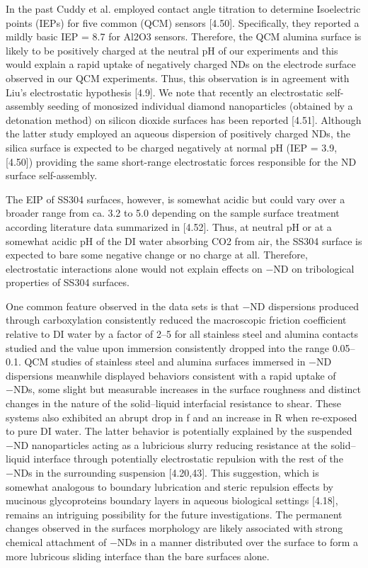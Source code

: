 In the past Cuddy et al. employed contact angle titration to determine Isoelectric points (IEPs) for five common (QCM) sensors [4.50]. Specifically, they reported a mildly basic IEP = 8.7 for Al2O3 sensors. Therefore, the QCM alumina surface is likely to be positively charged at the neutral pH of our experiments and this would explain a rapid uptake of negatively charged NDs on the electrode surface observed in our QCM experiments. Thus, this observation is in agreement with Liu’s electrostatic hypothesis [4.9]. We note that recently an electrostatic self-assembly seeding of monosized individual diamond nanoparticles (obtained by a detonation method) on silicon dioxide surfaces has been reported [4.51]. Although the latter study employed an aqueous dispersion of positively charged NDs, the silica surface is expected to be charged negatively at normal pH (IEP = 3.9, [4.50]) providing the same short-range electrostatic forces responsible for the ND surface self-assembly.

The EIP of SS304 surfaces, however, is somewhat acidic but could vary over a broader range from ca. 3.2 to 5.0 depending on the sample surface treatment according literature data summarized in [4.52]. Thus, at neutral pH or at a somewhat acidic pH of the DI water absorbing CO2 from air, the SS304 surface is expected to bare some negative change or no charge at all. Therefore, electrostatic interactions alone would not explain effects on −ND on tribological properties of SS304 surfaces.

One common feature observed in the data sets is that −ND dispersions produced through carboxylation consistently reduced the macroscopic friction coefficient relative to DI water by a factor of 2–5 for all stainless steel and alumina contacts studied and the value upon immersion consistently dropped into the range 0.05–0.1. QCM studies of stainless steel and alumina surfaces immersed in −ND dispersions meanwhile displayed behaviors consistent with a rapid uptake of −NDs, some slight but measurable increases in the surface roughness and distinct changes in the nature of the solid–liquid interfacial resistance to shear. These systems also exhibited an abrupt drop in f and an increase in R when re-exposed to pure DI water. The latter behavior is potentially explained by the suspended −ND nanoparticles acting as a lubricious slurry reducing resistance at the solid–liquid interface through potentially electrostatic repulsion with the rest of the −NDs in the surrounding suspension [4.20,43]. This suggestion, which is somewhat analogous to boundary lubrication and steric repulsion effects by mucinous glycoproteins boundary layers in aqueous biological settings [4.18], remains an intriguing possibility for the future investigations. The permanent changes observed in the surfaces morphology are likely associated with strong chemical attachment of −NDs in a manner distributed over the surface to form a more lubricous sliding interface than the bare surfaces alone.

